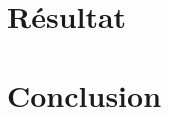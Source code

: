 \documentclass[letterpaper]{article}
\begin{document}
\section{Résultat}


\section{Conclusion}
  
  
% 
  

\footnotesize
\nocite{*}


\end{document}
